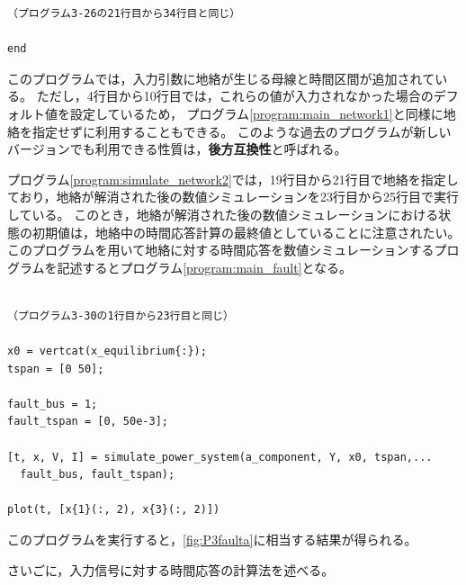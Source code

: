 \documentclass[tombow,dvipdfmx]{corona-a5-1.1}
\begin{document}
\begin{例}[地絡に対する時間応答の数値計算]
\begin{PROGRAMA}[count,title={simulate\_power\_system.m}]
\begin{verbatim}
（プログラム3-26の21行目から34行目と同じ）

end
\end{verbatim}
\end{PROGRAMA}

このプログラムでは，入力引数に地絡が生じる母線と時間区間が追加されている。
ただし，4行目から10行目では，これらの値が入力されなかった場合のデフォルト値を設定しているため，
プログラム\nobreak\ref{program:main_network1}と同様に地絡を指定せずに利用することもできる。
このような過去のプログラムが新しいバージョンでも利用できる性質は，\textbf{後方互換性}と呼ばれる。

プログラム\nobreak\ref{program:simulate_network2}では，19行目から21行目で地絡を指定しており，地絡が解消された後の数値シミュレーションを23行目から25行目で実行している。
このとき，地絡が解消された後の数値シミュレーションにおける状態の初期値は，地絡中の時間応答計算の最終値としていることに注意されたい。
このプログラムを用いて地絡に対する時間応答を数値シミュレーションするプログラムを記述するとプログラム\nobreak\ref{program:main_fault}となる。

\smallskip
\begin{PROGRAMA}[count,title={main\_simulation\_3bus\_fault.m}]\label{program:main_fault}
\begin{verbatim}

（プログラム3-30の1行目から23行目と同じ）

x0 = vertcat(x_equilibrium{:});
tspan = [0 50];

fault_bus = 1;
fault_tspan = [0, 50e-3];

[t, x, V, I] = simulate_power_system(a_component, Y, x0, tspan,...
  fault_bus, fault_tspan);

plot(t, [x{1}(:, 2), x{3}(:, 2)])
\end{verbatim}
\end{PROGRAMA}

このプログラムを実行すると，\ref{fig:P3faulta}に相当する結果が得られる。
\end{例}

さいごに，入力信号に対する時間応答の計算法を述べる。
\end{document}

